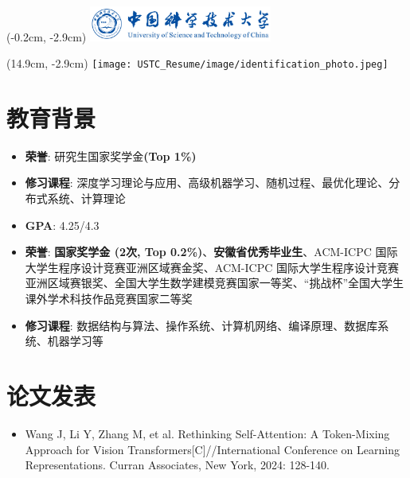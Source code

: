 \documentclass{cls/resume}
\begin{document}


\begin{textblock*}{6cm}(-0.2cm, -2.9cm)
    \includegraphics[width=6cm]{image/logo.png}
\end{textblock*}
\begin{textblock*}{2.5cm}(14.9cm, -2.9cm)
    \texttt{[image: USTC\_Resume/image/identification\_photo.jpeg]}
\end{textblock*}

\vspace{0.2cm} 

\section{教育背景}
\begin{itemize}[parsep=0.2ex]
    \item \textbf{荣誉}: 研究生国家奖学金\textbf{(Top 1\%)}
    \item \textbf{修习课程}: 深度学习理论与应用、高级机器学习、随机过程、最优化理论、分布式系统、计算理论
\end{itemize}
\begin{itemize}[parsep=0.2ex]
    \item \textbf{GPA}: 4.25/4.3
    \item \textbf{荣誉}: \textbf{国家奖学金 (2次, Top 0.2\%)}、\textbf{安徽省优秀毕业生}、ACM-ICPC 国际大学生程序设计竞赛亚洲区域赛金奖、ACM-ICPC 国际大学生程序设计竞赛亚洲区域赛银奖、全国大学生数学建模竞赛国家一等奖、“挑战杯”全国大学生课外学术科技作品竞赛国家二等奖
    \item \textbf{修习课程}: 数据结构与算法、操作系统、计算机网络、编译原理、数据库系统、机器学习等
\end{itemize}

\section{论文发表}
\begin{itemize}
    \item Wang J, Li Y, Zhang M, et al. Rethinking Self-Attention: A Token-Mixing Approach for Vision Transformers[C]//International Conference on Learning Representations. Curran Associates, New York, 2024: 128-140.
\end{itemize}
\end{document}
